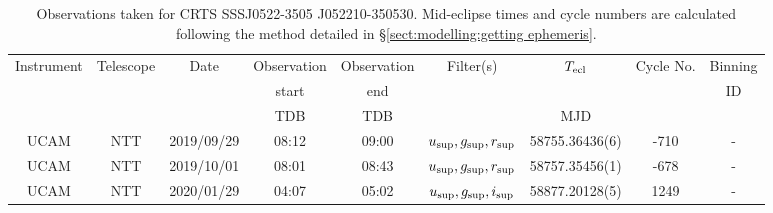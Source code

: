 \begin{table}
	\begin{center}
		\caption{Observations taken for CRTS SSSJ0522-3505 J052210-350530. Mid-eclipse times and cycle numbers are calculated following the method detailed in \S\ref{sect:modelling:getting ephemeris}.}
		\label{table:observing:observation logs SSSJ0522-3505}
		\begin{tabular}{ccccccccc}
			\hline
			Instrument & Telescope & Date & Observation  & Observation  & Filter(s) & $T_{\rm ecl}$ & Cycle No. & Binning \\
			 &  &  &  start &  end &  &  &  & ID \\
			 &  &  & TDB & TDB &  & MJD &  &  \\
			\hline
			\hline
			UCAM & NTT & 2019/09/29 & 08:12    & 09:00    & $u_{\rm sup},g_{\rm sup},r_{\rm sup}$ & 58755.36436(6)  &  -710 & - \\
			UCAM & NTT & 2019/10/01 & 08:01    & 08:43    & $u_{\rm sup},g_{\rm sup},r_{\rm sup}$ & 58757.35456(1)  &  -678 & - \\
			UCAM & NTT & 2020/01/29 & 04:07    & 05:02    & $u_{\rm sup},g_{\rm sup},i_{\rm sup}$ & 58877.20128(5)  &  1249 & - \\
		   \hline
		\end{tabular}
	\end{center}
\end{table}